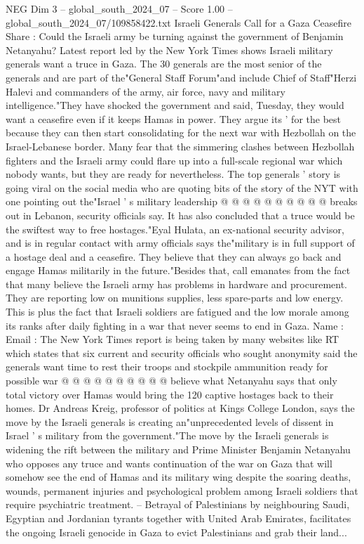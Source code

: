 \begin{textsample}{NEG Dim 3 – global\_south\_2024\_07 – Score 1.00 – global\_south\_2024\_07/109858422.txt}  \label{ex:f3_neg_145}
Israeli Generals Call for a Gaza Ceasefire Share : Could the Israeli army be turning against the government of Benjamin Netanyahu?
Latest report led by the New York Times shows Israeli military generals want a truce in Gaza.
The 30 generals are the most senior of the generals and are part of the"General Staff Forum"and include Chief of Staff"Herzi Halevi and commanders of the army, air force, navy and military intelligence."They have shocked the government and said, Tuesday, they would want a ceasefire even if it keeps Hamas in power.
They argue its ' for the best because they can then start consolidating for the next war with Hezbollah on the Israel-Lebanese border.
Many fear that the simmering clashes between Hezbollah fighters and the Israeli army could flare up into a full-scale regional war which nobody wants, but they are ready for nevertheless.
The top generals ' story is going viral on the social media who are quoting bits of the story of the NYT with one pointing out the"Israel ' s military leadership @ @ @ @ @ @ @ @ @ @ breaks out in Lebanon, security officials say.
It has also concluded that a truce would be the swiftest way to free hostages."Eyal Hulata, an ex-national security advisor, and is in regular contact with army officials says the"military is in full support of a hostage deal and a ceasefire.
They believe that they can always go back and engage Hamas militarily in the future."Besides that, call emanates from the fact that many believe the Israeli army has problems in hardware and procurement.
They are reporting low on munitions supplies, less spare-parts and low energy.
This is plus the fact that Israeli soldiers are fatigued and the low morale among its ranks after daily fighting in a war that never seems to end in Gaza.
Name : Email : The New York Times report is being taken by many websites like RT which states that six current and security officials who sought anonymity said the generals want time to rest their troops and stockpile ammunition ready for possible war @ @ @ @ @ @ @ @ @ @ believe what Netanyahu says that only total victory over Hamas would bring the 120 captive hostages back to their homes.
Dr Andreas Kreig, professor of politics at Kings College London, says the move by the Israeli generals is creating an"unprecedented levels of dissent in Israel ' s military from the government."The move by the Israeli generals is widening the rift between the military and Prime Minister Benjamin Netanyahu who opposes any truce and wants continuation of the war on Gaza that will somehow see the end of Hamas and its military wing despite the soaring deaths, wounds, permanent injuries and psychological problem among Israeli soldiers that require psychiatric treatment. -- Betrayal of Palestinians by neighbouring Saudi, Egyptian and Jordanian tyrants together with United Arab Emirates, facilitates the ongoing Israeli genocide in Gaza to evict Palestinians and grab their land...

\end{textsample}
